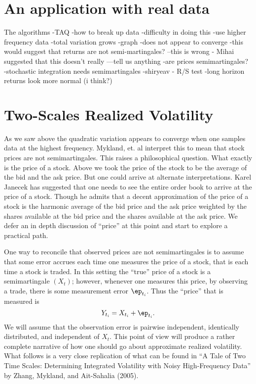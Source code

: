 \documentclass{report}
\begin{document}
\section*{An application with real data}

The algorithms
  -TAQ
  -how to break up data
    -difficulty in doing this
  -use higher frequency data
  -total variation grows
  -graph
  -does not appear to converge
  -this would suggest that returns are not semi-martingales?
  --this is wrong - Mihai suggested that this doesn't really
  ---tell us anything
  -are prices semimartingales?
     -stochastic integration needs semimartingales
  -shiryeav - R/S test
  -long horizon returns look more normal (i think?)

\section*{Two-Scales Realized Volatility}

As we saw above the quadratic variation appears to converge when one
samples data at the highest frequency.  Mykland, et. al interpret this
to mean that stock prices are not semimartingales.  This raises a
philosophical question.  What exactly is the price of a stock.  Above
we took the price of the stock to be the average of the bid and the
ask price.  But one could arrive at alternate interpretations.  Karel
Janecek has suggested that one needs to see the entire order book to
arrive at the price of a stock.  Though he admits that a decent
approximation of the price of a stock is the harmonic average of the
bid price and the ask price weighted by the shares available at the
bid price and the shares available at the ask price.  We defer an in
depth discussion of ``price'' at this point and start to explore a
practical path.

One way to reconcile that observed prices are not semimartingales is
to assume that some error accrues each time one measures the price of
a stock, that is each time a stock is traded.  In this setting the
``true'' price of a stock is a semimartingale $(X_t)$; however,
whenever one measures this price, by observing a trade, there is some
measurement error $\ep_{t_i}$.  Thus the ``price'' that is measured is
\[
Y_{t_i} = X_{t_i} + \ep_{t_i}.
\]
We will assume that the observation error is pairwise independent,
identically distributed, and independent of $X_t$.  This point of view
will produce a rather complete narrative of how one should go about
approximate realized volatility.  What follows is a very close
replication of what can be found in ``A Tale of Two Time Scales:
Determining Integrated Volatility with Noisy High-Frequency Data'' by
Zhang, Mykland, and Ait-Sahalia (2005).  
\end{document}
